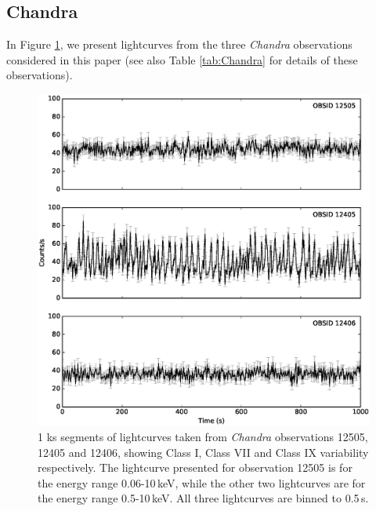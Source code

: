 \subsection{Chandra}

\par In Figure \ref{fig:Cha_lc}, we present lightcurves from the three \textit{Chandra} observations considered in this paper (see also Table \ref{tab:Chandra} for details of these observations).

\begin{figure}
    \includegraphics[width=0.8\columnwidth, trim = 0.6cm 0 3.9cm 0]{images/Chandra.eps}
    \captionsetup{singlelinecheck=off}
    \caption{1 ks segments of lightcurves taken from \textit{Chandra} observations 12505, 12405 and 12406, showing Class I, Class VII and Class IX variability respectively.  The lightcurve presented for observation 12505 is for the energy range 0.06-10\,keV, while the other two lightcurves are for the energy range 0.5-10\,keV.  All three lightcurves are binned to 0.5\,s.}
   \label{fig:Cha_lc}
\end{figure}

